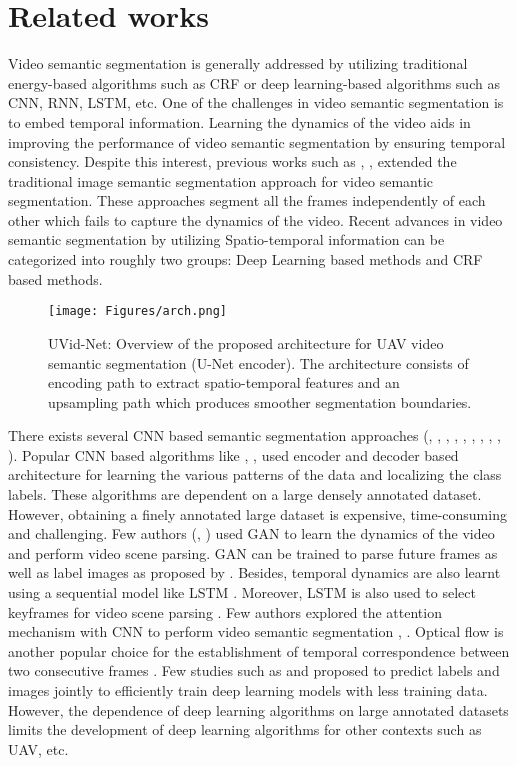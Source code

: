 \documentclass[journal]{IEEEtran}
\begin{document}
\section{Related works}
\label{sec:literature}
Video semantic segmentation is generally addressed by utilizing traditional energy-based algorithms such as CRF or deep learning-based algorithms such as CNN, RNN, LSTM, etc. One of the challenges in video semantic segmentation is to embed temporal information. Learning the dynamics of the video aids in improving the performance of video semantic segmentation by ensuring temporal consistency. Despite this interest, previous works such as \cite{19}, \cite{semantic}, \cite{1} extended the traditional image semantic segmentation approach for video semantic segmentation. These approaches segment all the frames independently of each other which fails to capture the dynamics of the video. Recent advances in video semantic segmentation by utilizing Spatio-temporal information can be categorized into roughly two groups: Deep Learning based methods and CRF based methods.
\begin{figure*}[h]
	\begin{center}
		\texttt{[image: Figures/arch.png]}
	\end{center}
	\caption{UVid-Net: Overview of the proposed architecture for UAV video semantic segmentation (U-Net encoder). The architecture consists of encoding path to extract spatio-temporal features and an upsampling path which produces smoother segmentation boundaries.}
	\label{fig:unet}
\end{figure*}



There exists several CNN based semantic segmentation approaches (\cite{15}, \cite{16}, \cite{22}, \cite{23}, \cite{24}, \cite{25}, \cite{26}, \cite{27}, \cite{28}, \cite{29}). Popular CNN based algorithms like \cite{2}, \cite{4}, \cite{34} used encoder and decoder based architecture for learning the various patterns of the data and localizing the class labels. These algorithms are dependent on a large densely annotated dataset. However, obtaining a finely annotated large dataset is expensive, time-consuming and challenging. Few authors (\cite{28}, \cite{15}) used GAN to learn the dynamics of the video and perform video scene parsing. GAN can be trained to parse future frames as well as label images as proposed by \cite{15}.  Besides, temporal dynamics are also learnt using a sequential model like LSTM \cite{wang2019deep}. Moreover,  LSTM is also used to select keyframes for video scene parsing \cite{16}. Few authors explored the attention mechanism with CNN to perform video semantic segmentation \cite{27}, \cite{29}. Optical flow is another popular choice for the establishment of temporal correspondence between two consecutive frames \cite{25}. Few studies such as \cite{22} and \cite{23} proposed to predict labels and images jointly to efficiently train deep learning models with less training data. However, the dependence of deep learning algorithms on large annotated datasets limits the development of deep learning algorithms for other contexts such as UAV, etc. 
\end{document}
